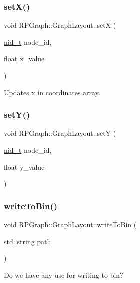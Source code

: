 \subsubsection{\texorpdfstring{set\+X()}{setX()}}
{\footnotesize\ttfamily void R\+P\+Graph\+::\+Graph\+Layout\+::setX (\begin{DoxyParamCaption}\item[{\mbox{\hyperlink{namespaceRPGraph_ab3ae34f1ab88e48f43794c30c8697b74}{nid\+\_\+t}}}]{node\+\_\+id,  }\item[{float}]{x\+\_\+value }\end{DoxyParamCaption})}

Updates x in coordinates array. \mbox{\label{classRPGraph_1_1GraphLayout_a55203ccaaba03d4dd739c2e6552be90e}} 
\subsubsection{\texorpdfstring{set\+Y()}{setY()}}
{\footnotesize\ttfamily void R\+P\+Graph\+::\+Graph\+Layout\+::setY (\begin{DoxyParamCaption}\item[{\mbox{\hyperlink{namespaceRPGraph_ab3ae34f1ab88e48f43794c30c8697b74}{nid\+\_\+t}}}]{node\+\_\+id,  }\item[{float}]{y\+\_\+value }\end{DoxyParamCaption})}

\mbox{\label{classRPGraph_1_1GraphLayout_a19fb67898bdb294ac46fb098ec2b0bad}} 
\subsubsection{\texorpdfstring{write\+To\+Bin()}{writeToBin()}}
{\footnotesize\ttfamily void R\+P\+Graph\+::\+Graph\+Layout\+::write\+To\+Bin (\begin{DoxyParamCaption}\item[{std\+::string}]{path }\end{DoxyParamCaption})}

Do we have any use for writing to bin? \mbox{\label{classRPGraph_1_1GraphLayout_ae01b3ad2b348683c2e55d49496c32800}} 
